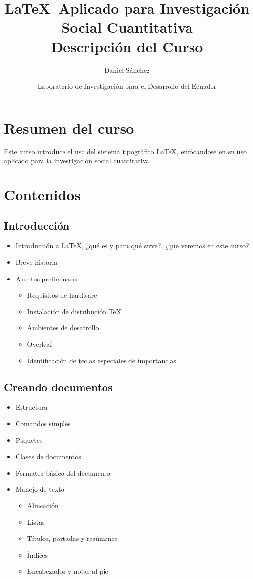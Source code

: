 \documentclass[a4paper,12pt]{article}
\title{\textbf{\LaTeX \ Aplicado para Investigación Social Cuantitativa} \\[1em] \Large Descripción del Curso}
\author{Daniel Sánchez}
\date{Laboratorio de Investigación para el Desarrollo del Ecuador}
\begin{document}
\maketitle

\section{Resumen del curso}

Este curso introduce el uso del sistema tipográfico \LaTeX, enfócandose en su uso aplicado para la investigación social cuantitativa. 

\section{Contenidos}

\subsection{Introducción}

\begin{itemize}
    \item Introducción a \LaTeX, ¿qué es y para qué sirve?, ¿que veremos en este curso? 
    \item Breve historia
    \item Asuntos preliminares
    \begin{itemize}
        \item Requisitos de hardware
        \item  Instalación de distribución \TeX
        \item Ambientes de desarrollo
        \item Overleaf
        \item Identificación de teclas especiales de importancias
    \end{itemize}
   
\end{itemize}

\subsection{Creando documentos}

\begin{itemize}
    \item Estructura
    \item Comandos simples
    \item Paquetes 
    \item Clases de documentos
    \item Formateo básico del documento 
    \item Manejo de texto
    \begin{itemize}
        \item Alineación
        \item Listas 
        \item Títulos, portadas y resúmenes
        \item Índices
        \item Encabezados y notas al pie
    \end{itemize}
\end{itemize}
\end{document}
